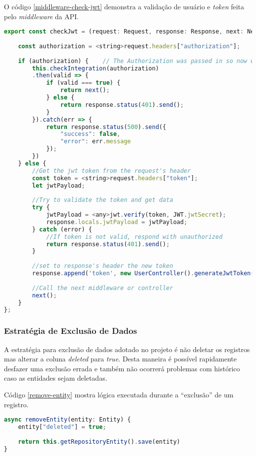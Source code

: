 O código \ref{middleware-check-jwt} demonstra a validação de usuário e \textit{token} feita pelo \textit{middleware} da API.
\begin{lstlisting}[language=JavaScript, caption={Função para validação de autenticação da API}, label={middleware-check-jwt}]
export const checkJwt = (request: Request, response: Response, next: NextFunction) => {
	
	const authorization = <string>request.headers["authorization"];
	
	if (authorization) {    // The Authorization was passed in so now we validate it
		this.checkIntegration(authorization)
		.then(valid => {
			if (valid === true) {
				return next();
			} else {
				return response.status(401).send();  
			}
		}).catch(err => {
			return response.status(500).send({
				"success": false,
				"error": err.message
			});
		})
	} else {
		//Get the jwt token from the request's header
		const token = <string>request.headers["token"];
		let jwtPayload;
		
		//Try to validate the token and get data
		try {
			jwtPayload = <any>jwt.verify(token, JWT.jwtSecret);
			response.locals.jwtPayload = jwtPayload;
		} catch (error) {
			//If token is not valid, respond with unauthorized
			return response.status(401).send();
		}
		
		//set to response's header the new token
		response.append('token', new UserController().generateJwtToken(<User> jwtPayload));
		
		//Call the next middleware or controller
		next();
	}
};

\end{lstlisting}


\subsubsection{Estratégia de Exclusão de Dados}

A estratégia para exclusão de dados adotado no projeto é não deletar os registros mas alterar a coluna \textit{deleted} para \textit{true}. Desta maneira é possível rapidamente desfazer uma exclusão errada e também não ocorrerá problemas com histórico caso as entidades sejam deletadas.

Código \ref{remove-entity} mostra lógica executada durante a ``exclusão'' de um registro.
\begin{lstlisting}[language=JavaScript, caption={Método para exclusão de registro}, label={remove-entity}]
async removeEntity(entity: Entity) {
	entity["deleted"] = true;
	
	return this.getRepositoryEntity().save(entity)
}
\end{lstlisting}

